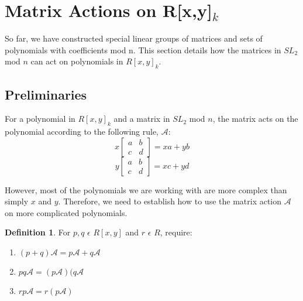 \documentclass[a4paper,draft]{amsproc}
\theoremstyle{plain}
\theoremstyle{definition}
\newtheorem{dfn}{Definition}[section]
\theoremstyle{remark}
\numberwithin{equation}{section}
\begin{document}
\section{Matrix Actions on R[x,y]$_{k}$} 
So far, we have constructed special linear groups of matrices and sets of polynomials with coefficients mod n. This section details how the matrices in $SL_{2}$ mod $n$ can act on polynomials in $R[x,y]_{k}$. 

\subsection{Preliminaries}
For a polynomial in $R[x,y]_{k}$ and a matrix in $SL_{2}$ mod $n$, the matrix acts on the polynomial according to the following rule, $\mathcal{A}$: 
$$
x\begin{bmatrix}
 a&b \\ 
 c&d 
\end{bmatrix} = xa + yb 
$$
$$
y\begin{bmatrix}
 a&b \\ 
 c&d 
\end{bmatrix} = xc + yd 
$$

However, most of the polynomials we are working with are more complex than simply $x$ and $y$. Therefore, we need to establish how to use the matrix action $\mathcal{A}$ on more complicated polynomials. 
\begin{dfn}
For $p, q$ $\epsilon$ $R[x,y]$ and $r$ $\epsilon$ $R$, require: 
\begin{enumerate}
\item $(p+q)\mathcal{A} = p\mathcal{A} + q\mathcal{A}$
\item $pq\mathcal{A} = (p\mathcal{A})(q\mathcal{A}$
\item $rp\mathcal{A} = r(p\mathcal{A})$
\end{enumerate}
\end{dfn}
\end{document}
